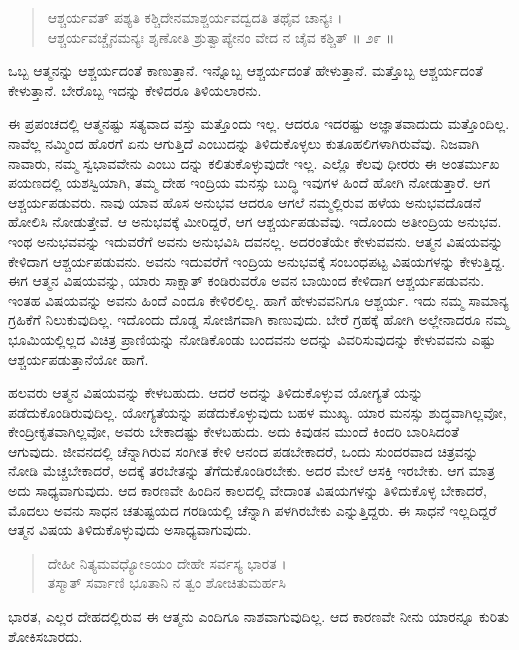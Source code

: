 \begin{verse}
ಆಶ್ಚರ್ಯವತ್ ಪಶ್ಯತಿ ಕಶ್ಚಿದೇನಮಾಶ್ಚರ್ಯವದ್ವದತಿ ತಥೈವ ಚಾನ್ಯಃ ।\\ಆಶ್ಚರ್ಯವಚ್ಚೈನಮನ್ಯಃ ಶೃಣೋತಿ ಶ್ರುತ್ವಾಪ್ಯೇನಂ ವೇದ ನ ಚೈವ ಕಶ್ಚಿತ್ \num{॥ ೨೯ ॥}
\end{verse}

{\small ಒಬ್ಬ ಆತ್ಮನನ್ನು ಆಶ್ಚರ್ಯದಂತೆ ಕಾಣುತ್ತಾನೆ. ಇನ್ನೊಬ್ಬ ಆಶ್ಚರ್ಯದಂತೆ ಹೇಳುತ್ತಾನೆ. ಮತ್ತೊಬ್ಬ ಆಶ್ಚರ್ಯದಂತೆ ಕೇಳುತ್ತಾನೆ. ಬೇರೊಬ್ಬ ಇದನ್ನು ಕೇಳಿದರೂ ತಿಳಿಯಲಾರನು.}

ಈ ಪ್ರಪಂಚದಲ್ಲಿ ಆತ್ಮನಷ್ಟು ಸತ್ಯವಾದ ವಸ್ತು ಮತ್ತೊಂದು ಇಲ್ಲ. ಆದರೂ ಇದರಷ್ಟು ಅಜ್ಞಾತವಾದುದು ಮತ್ತೊಂದಿಲ್ಲ. ನಾವೆಲ್ಲ ನಮ್ಮಿಂದ ಹೊರಗೆ ಏನು ಆಗುತ್ತಿದೆ ಎಂಬುದನ್ನು ತಿಳಿದುಕೊಳ್ಳಲು ಕುತೂಹಲಿಗಳಾಗಿರುವೆವು. ನಿಜವಾಗಿ ನಾವಾರು, ನಮ್ಮ ಸ್ವಭಾವವೇನು ಎಂಬು ದನ್ನು ಕಲಿತುಕೊಳ್ಳುವುದೇ ಇಲ್ಲ. ಎಲ್ಲೊ ಕೆಲವು ಧೀರರು ಈ ಅಂತರ್ಮುಖ ಪಯಣದಲ್ಲಿ ಯಶಸ್ವಿಯಾಗಿ, ತಮ್ಮ ದೇಹ ಇಂದ್ರಿಯ ಮನಸ್ಸು ಬುದ್ಧಿ ಇವುಗಳ ಹಿಂದೆ ಹೋಗಿ ನೋಡುತ್ತಾರೆ. ಆಗ ಆಶ್ಚರ್ಯಪಡುವರು. ನಾವು ಯಾವ ಹೊಸ ಅನುಭವ ಆದರೂ ಆಗಲೆ ನಮ್ಮಲ್ಲಿರುವ ಹಳೆಯ ಅನುಭವದೊಡನೆ ಹೋಲಿಸಿ ನೋಡುತ್ತೇವೆ. ಆ ಅನುಭವಕ್ಕೆ ಮೀರಿದ್ದರೆ, ಆಗ ಆಶ್ಚರ್ಯಪಡುವೆವು. ಇದೊಂದು ಅತೀಂದ್ರಿಯ ಅನುಭವ. ಇಂಥ ಅನುಭವವನ್ನು ಇದುವರೆಗೆ ಅವನು ಅನುಭವಿಸಿ ದವನಲ್ಲ. ಅದರಂತೆಯೇ ಕೇಳುವವನು. ಆತ್ಮನ ವಿಷಯವನ್ನು ಕೇಳಿದಾಗ ಆಶ್ಚರ್ಯಪಡುವನು. ಅವನು ಇದುವರೆಗೆ ಇಂದ್ರಿಯ ಅನುಭವಕ್ಕೆ ಸಂಬಂಧಪಟ್ಟ ವಿಷಯಗಳನ್ನು ಕೇಳುತ್ತಿದ್ದ. ಈಗ ಆತ್ಮನ ವಿಷಯವನ್ನು, ಯಾರು ಸಾಕ್ಷಾತ್ ಕಂಡಿರುವರೊ ಅವನ ಬಾಯಿಂದ ಕೇಳಿದಾಗ ಆಶ್ಚರ್ಯಪಡುವನು. ಇಂತಹ ವಿಷಯವನ್ನು ಅವನು ಹಿಂದೆ ಎಂದೂ ಕೇಳಿರಲಿಲ್ಲ. ಹಾಗೆ ಹೇಳುವವನಿಗೂ ಆಶ್ಚರ್ಯ. ಇದು ನಮ್ಮ ಸಾಮಾನ್ಯ ಗ್ರಹಿಕೆಗೆ ನಿಲುಕುವುದಿಲ್ಲ. ಇದೊಂದು ದೊಡ್ಡ ಸೋಜಿಗವಾಗಿ ಕಾಣುವುದು. ಬೇರೆ ಗ್ರಹಕ್ಕೆ ಹೋಗಿ ಅಲ್ಲೇನಾದರೂ ನಮ್ಮ ಭೂಮಿಯಲ್ಲಿಲ್ಲದ ವಿಚಿತ್ರ ಪ್ರಾಣಿಯನ್ನು ನೋಡಿಕೊಂಡು ಬಂದವನು ಅದನ್ನು ವಿವರಿಸುವುದನ್ನು ಕೇಳುವವನು ಎಷ್ಟು ಆಶ್ಚರ್ಯಪಡುತ್ತಾನೆಯೋ ಹಾಗೆ.

ಹಲವರು ಆತ್ಮನ ವಿಷಯವನ್ನು ಕೇಳಬಹುದು. ಆದರೆ ಅದನ್ನು ತಿಳಿದುಕೊಳ್ಳುವ ಯೋಗ್ಯತೆ ಯನ್ನು ಪಡೆದುಕೊಂಡಿರುವುದಿಲ್ಲ. ಯೋಗ್ಯತೆಯನ್ನು ಪಡೆದುಕೊಳ್ಳುವುದು ಬಹಳ ಮುಖ್ಯ. ಯಾರ ಮನಸ್ಸು ಶುದ್ಧವಾಗಿಲ್ಲವೋ, ಕೇಂದ್ರೀಕೃತವಾಗಿಲ್ಲವೋ, ಅವರು ಬೇಕಾದಷ್ಟು ಕೇಳಬಹುದು. ಅದು ಕಿವುಡನ ಮುಂದೆ ಕಿಂದರಿ ಬಾರಿಸಿದಂತೆ ಆಗುವುದು. ಜೀವನದಲ್ಲಿ ಚೆನ್ನಾಗಿರುವ ಸಂಗೀತ ಕೇಳಿ ಆನಂದ ಪಡಬೇಕಾದರೆ, ಒಂದು ಸುಂದರವಾದ ಚಿತ್ರವನ್ನು ನೋಡಿ ಮೆಚ್ಚಬೇಕಾದರೆ, ಅದಕ್ಕೆ ತರಬೇತನ್ನು ತೆಗೆದುಕೊಂಡಿರಬೇಕು. ಅದರ ಮೇಲೆ ಆಸಕ್ತಿ ಇರಬೇಕು. ಆಗ ಮಾತ್ರ ಅದು ಸಾಧ್ಯವಾಗುವುದು. ಆದ ಕಾರಣವೇ ಹಿಂದಿನ ಕಾಲದಲ್ಲಿ ವೇದಾಂತ ವಿಷಯಗಳನ್ನು ತಿಳಿದುಕೊಳ್ಳ ಬೇಕಾದರೆ, ಮೊದಲು ಅವನು ಸಾಧನ ಚತುಷ್ಟಯದ ಗರಡಿಯಲ್ಲಿ ಚೆನ್ನಾಗಿ ಪಳಗಿರಬೇಕು ಎನ್ನುತ್ತಿದ್ದರು. ಈ ಸಾಧನೆ ಇಲ್ಲದಿದ್ದರೆ ಆತ್ಮನ ವಿಷಯ ತಿಳಿದುಕೊಳ್ಳುವುದು ಅಸಾಧ್ಯವಾಗುವುದು.

\begin{verse}
ದೇಹೀ ನಿತ್ಯಮವಧ್ಯೋಽಯಂ ದೇಹೇ ಸರ್ವಸ್ಯ ಭಾರತ ।\\ತಸ್ಮಾತ್ ಸರ್ವಾಣಿ ಭೂತಾನಿ ನ ತ್ವಂ ಶೋಚಿತುಮರ್ಹಸಿ 
\end{verse}

{\small ಭಾರತ, ಎಲ್ಲರ ದೇಹದಲ್ಲಿರುವ ಈ ಆತ್ಮನು ಎಂದಿಗೂ ನಾಶವಾಗುವುದಿಲ್ಲ. ಆದ ಕಾರಣವೇ ನೀನು ಯಾರನ್ನೂ ಕುರಿತು ಶೋಕಿಸಬಾರದು.}

